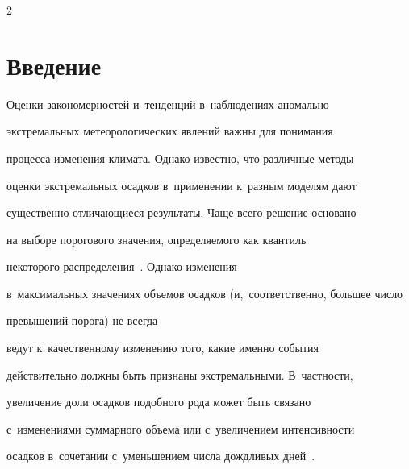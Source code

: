 \vspace*{-4pt}













\thispagestyle{headings}





\begin{multicols}{2}





\label{st\stat}





\section{Введение}





Оценки закономерностей и~тенденций в~наблюдениях аномально


экстремальных метеорологических явлений важны для понимания


процесса изменения климата. Однако известно, что различные методы


оценки экстремальных осадков в~применении к~разным моделям дают


существенно отличающиеся результаты. Чаще всего решение основано


на выборе порогового значения, определяемого как квантиль 


некоторого распределения~\cite{Groisman1999}. Однако изменения 


в~максимальных значениях объемов осадков (и,~соответственно, большее число 


превышений порога) не всегда


ведут к~качественному изменению того, какие именно события


действительно должны быть признаны экстремальными. В~частности,


увеличение доли осадков подобного рода может быть связано 


с~изменениями суммарного объема или с~увеличением интенсивности


осадков в~сочетании с~уменьшением числа дождливых дней~\cite{Zolina2008}.






\end{multicols}
